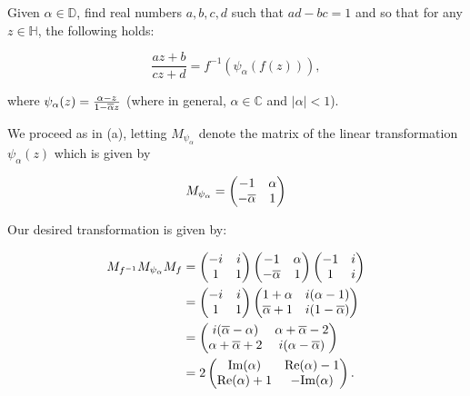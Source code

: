Given $\alpha \in \mathbb{D}$, find real numbers $a, b, c, d$ such that $ad - bc = 1$ and so that for any 
$z \in \mathbb{H}$, the following holds:

$$
\frac{az + b}{cz + d} = f^{-1} \left(\psi_{\alpha} (f(z)) \right),
$$

where $\psi_{\alpha}(z) = \frac{\alpha - z}{1 - \overline{\alpha}z}$ (where in general, $\alpha \in \mathbb{C}$ and $|\alpha| < 1$).

\begin{solution}
  We proceed as in (a), letting $M_{\psi_{\alpha}}$ denote the matrix of the linear transformation $\psi_{\alpha}(z)$
  which is given by

  $$
  M_{\psi_\alpha} = \begin{pmatrix}
    -1            & \alpha \\
    -\overline{\alpha} & 1
  \end{pmatrix}
  $$

  Our desired transformation is given by:


  \begin{align*}
    M_{f^{-1}} M_{\psi_\alpha} M_f &= \begin{pmatrix}
      -i & i \\
       1 & 1
    \end{pmatrix} \begin{pmatrix}
      -1             & \alpha \\
      -\overline{\alpha} & 1
    \end{pmatrix} \begin{pmatrix}
      -1 & i \\
       1 & i
    \end{pmatrix} \\
    &= \begin{pmatrix}
      -i & i \\
       1 & 1
    \end{pmatrix} \begin{pmatrix}
      1 + \alpha        & i(\alpha -1) \\
      \overline{\alpha} + 1 & i(1 - \overline{\alpha})
    \end{pmatrix} \\
    &= \begin{pmatrix}
      i(\overline{\alpha} - \alpha)  & \alpha + \overline{\alpha} - 2 \\
      \alpha + \overline{\alpha} + 2 & i(\alpha - \overline{\alpha})
    \end{pmatrix} \\
    &= 2 \begin{pmatrix}
      \text{Im}(\alpha)     &  \text{Re}(\alpha) - 1 \\
      \text{Re}(\alpha) + 1 & -\text{Im}(\alpha)
    \end{pmatrix}.
  \end{align*}


\end{solution}
